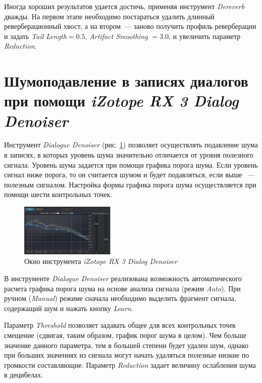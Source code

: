 \documentclass[oneside, final, 14pt]{extreport}
\begin{document}
Иногда хороших результатов удается достичь, применяя инструмент \emph{Dereverb} дважды. На первом этапе необходимо постараться удалить длинный реверберационный хвост, а на втором~--- заново получить профиль реверберации и задать \emph{Tail Length}$=0.5$, \emph{Artifact Smoothing} $=3.0$, и увеличить параметр \emph{Reduction}.

\section{Шумоподавление в записях диалогов при помощи \emph{iZotope RX 3 Dialog Denoiser}}
Инструмент \emph{Dialogue Denoiser} (рис. \ref{pic-rx3dialog-01}) позволяет осуществлять подавление шума в записях, в которых уровень шума значительно отличается от уровня полезного сигнала. Уровень шума задается при помощи графика порога шума. Если уровень сигнал ниже порога, то он считается шумом и будет подавляться, если выше ~--- полезным сигналом. Настройка формы графика порога шума осуществляется при помощи шести контрольных точек.

\begin{figure}[h!]
  \centering
  \includegraphics[width=0.4\textwidth]{pic-rx3dialog-01}
  \caption{Окно инструмента \emph{iZotope RX 3 Dialog Denoiser}}
  \label{pic-rx3dialog-01}
\end{figure}

В инструменте \emph{Dialogue Denoiser} реализована возможность автоматического расчета графика порога шума на основе анализа сигнала (режим \emph{Auto}). При ручном (\emph{Manual}) режиме сначала необходимо выделить фрагмент сигнала, содержащий шум и нажать кнопку \emph{Learn}.

Параметр \emph{Threshold} позволяет задавать общее для всех контрольных точек смещение (сдвигая, таким образом, график порог шума в целом). Чем больше значение данного параметра, тем в большей степени будет удален шум, однако при больших значениях из сигнала могут начать удаляться полезные низкие по громкости составляющие. Параметр \emph{Reduction} задает величину ослабления шума в децибелах.
\end{document}
